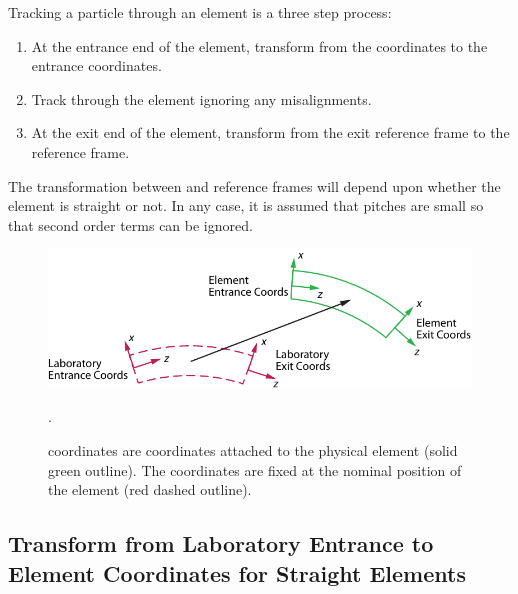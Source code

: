 Tracking a particle through an element is a three step process:
\begin{enumerate}
\item
At the entrance end of the element, transform from the 
coordinates to the entrance  coordinates.
\item
Track through the element ignoring any misalignments. 
\item
At the exit end of the element, transform from the exit 
reference frame to the  reference frame.
\end{enumerate}

The transformation between  and  reference
frames will depend upon whether the element is straight or not. In
any case, it is assumed that pitches are small so that second order
terms can be ignored.


\begin{figure}[tb]
  \centering
  \includegraphics[width=5in]{coord-offset.pdf}
  \caption[Element Coordinate System.]
  {
 coordinates are coordinates attached to the physical
element (solid green outline). The  coordinates are
fixed at the nominal position of the element (red dashed outline).
  }
  \label{f:ele.coord}.
\end{figure}

\subsection{Transform from Laboratory Entrance to Element Coordinates for Straight Elements}

